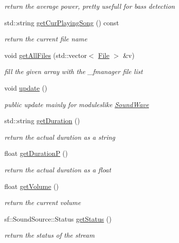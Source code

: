 \begin{DoxyCompactItemize}
\begin{DoxyCompactList}\small\item\em return the average power, pretty usefull for bass detection \end{DoxyCompactList}\item 
std\+::string \hyperlink{classAudioManager_a8a339e04973fab7321e1ef38ee10e996}{get\+Cur\+Playing\+Song} () const 
\begin{DoxyCompactList}\small\item\em return the current file name \end{DoxyCompactList}\item 
void \hyperlink{classAudioManager_aad81f933eb8aed87c2352b32fcbe9782}{get\+All\+Files} (std\+::vector$<$ \hyperlink{classFile}{File} $>$ \&v)
\begin{DoxyCompactList}\small\item\em fill the given array with the \+\_\+fmanager file list \end{DoxyCompactList}\item 
void \hyperlink{classAudioManager_af342d01281d35deac6df2f5fa729c0ef}{update} ()
\begin{DoxyCompactList}\small\item\em public update mainly for moduleslike \hyperlink{classSoundWave}{Sound\+Wave} \end{DoxyCompactList}\item 
std\+::string \hyperlink{classAudioManager_abedd7ab672ed15b3480cfacb1b7339b9}{get\+Duration} ()
\begin{DoxyCompactList}\small\item\em return the actual duration as a string \end{DoxyCompactList}\item 
float \hyperlink{classAudioManager_a331f7e948fa9a1e1d1a49f1fb48112c4}{get\+DurationP} ()
\begin{DoxyCompactList}\small\item\em return the actual duration as a float \end{DoxyCompactList}\item 
float \hyperlink{classAudioManager_a4d8a968f1a5741d4c9faa79bbcb95c79}{get\+Volume} ()
\begin{DoxyCompactList}\small\item\em return the current volume \end{DoxyCompactList}\item 
sf\+::\+Sound\+Source\+::\+Status \hyperlink{classAudioManager_a9ce4d8082a194bf780038a0aee942468}{get\+Status} ()
\begin{DoxyCompactList}\small\item\em return the status of the stream \end{DoxyCompactList}\end{DoxyCompactItemize}


